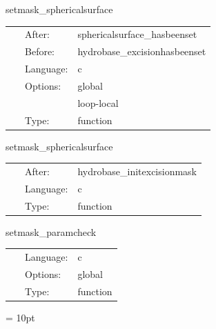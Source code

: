 
\hspace{5mm} setmask\_sphericalsurface 

\hspace{5mm}{\it set hydro\_excision\_mask according to spherical surface information } 


\hspace{5mm}

 \begin{tabular*}{160mm}{cll} 
~ & After:  & sphericalsurface\_hasbeenset \\ 
~ & Before:  & hydrobase\_excisionhasbeenset \\ 
~ & Language:  & c \\ 
~ & Options:  & global \\ 
~& ~ &loop-local\\ 
~ & Type:  & function \\ 
\end{tabular*} 


\vspace{5mm}


\hspace{5mm} setmask\_sphericalsurface 

\hspace{5mm}{\it set hydro\_excision\_mask according to spherical surface information } 


\hspace{5mm}

 \begin{tabular*}{160mm}{cll} 
~ & After:  & hydrobase\_initexcisionmask \\ 
~ & Language:  & c \\ 
~ & Type:  & function \\ 
\end{tabular*} 


\vspace{5mm}


\hspace{5mm} setmask\_paramcheck 

\hspace{5mm}{\it check parameters for consistency } 


\hspace{5mm}

 \begin{tabular*}{160mm}{cll} 
~ & Language:  & c \\ 
~ & Options:  & global \\ 
~ & Type:  & function \\ 
\end{tabular*} 



\vspace{5mm}\parskip = 10pt 

